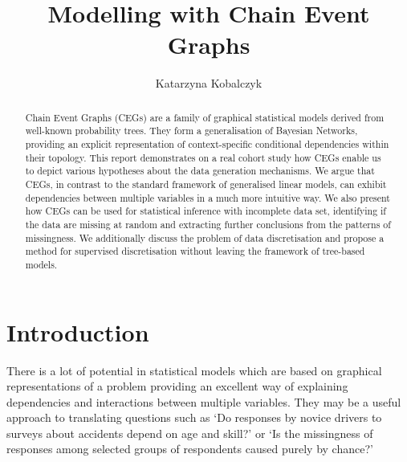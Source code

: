 \documentclass[runningheads]{llncs}
\begin{document}
\title{Modelling with Chain Event Graphs}


%
%
\author{Katarzyna Kobalczyk}
%
%

%
\maketitle
%
\begin{abstract}
Chain Event Graphs (CEGs) are a family of graphical statistical models derived from well-known probability trees. They form a generalisation of Bayesian Networks, providing an explicit representation of context-specific conditional dependencies within their topology. This report demonstrates on a real cohort study how CEGs enable us to depict various hypotheses about the data generation mechanisms. We argue that CEGs,  in contrast to the standard framework of generalised linear models, can exhibit dependencies between multiple variables in a much more intuitive way. We also present how CEGs can be used for statistical inference with incomplete data set, identifying if the data are missing at random and extracting further conclusions from the patterns of missingness. We additionally discuss the problem of data discretisation and propose a method for supervised discretisation without leaving the framework of tree-based models.

\end{abstract}

%
%
%
\section{Introduction}
There is a lot of potential in statistical models which are based on graphical representations of a problem providing an excellent way of explaining dependencies and interactions between multiple variables. They may be a useful approach to translating questions such as `Do responses by novice drivers to surveys about accidents depend on age and skill?' or `Is the missingness of responses among selected groups of respondents caused purely by chance?'
\end{document}
